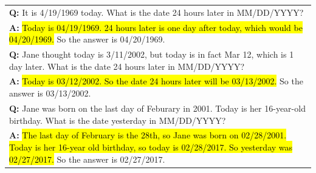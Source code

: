 \documentclass[]{article}
\theoremstyle{plain}
\theoremstyle{definition}
\theoremstyle{remark}
\begin{document}
\begin{table}[H]
\begin{tabular}{p{\linewidth}}
        \vspace{0mm}
        \textbf{Q:} It is 4/19/1969 today. What is the date 24 hours later in MM/DD/YYYY? \\
        \vspace{-1mm}
        \textbf{A:} \hl{Today is 04/19/1969. 24 hours later is one day after today, which would be 04/20/1969.} So the answer is 04/20/1969. \\
        \vspace{0mm}
        \textbf{Q:} Jane thought today is 3/11/2002, but today is in fact Mar 12, which is 1 day later. What is the date 24 hours later in MM/DD/YYYY? \\
        \vspace{-1mm}
        \textbf{A:} \hl{Today is 03/12/2002. So the date 24 hours later will be 03/13/2002.} So the answer is 03/13/2002. \\
        \vspace{0mm}
        \textbf{Q:} Jane was born on the last day of Feburary in 2001. Today is her 16-year-old birthday. What is the date yesterday in MM/DD/YYYY? \\
        \vspace{-1mm}
        \textbf{A:} \hl{The last day of February is the 28th, so Jane was born on 02/28/2001. Today is her 16-year old birthday, so today is 02/28/2017. So yesterday was 02/27/2017.} So the answer is 02/27/2017. \\
        \bottomrule
    \end{tabular}
    \label{tab:appendix-date-understanding-prompt}
\end{table}
\endgroup
\begingroup
\end{document}
